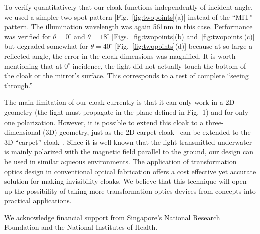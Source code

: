 \documentclass[preprint,preprintnumbers,amsmath,amssymb]{revtex4}
\begin{document}
To verify quantitatively that our cloak functions independently of
incident angle, we used a simpler two-spot pattern
[Fig.~\ref{fig:twopoints}(a)] instead of the ``MIT'' pattern. The
illumination wavelength was again 561nm in this case. Performance
was verified for $\theta=0^\circ$ and $\theta=18^\circ$
[Figs.~\ref{fig:twopoints}(b) and~\ref{fig:twopoints}(c)] but
degraded somewhat for $\theta=40^\circ$
[Fig.~\ref{fig:twopoints}(d)] because at so large a reflected angle,
the error in the cloak dimensions was magnified. It is worth
mentioning that at $0^{\circ}$ incidence, the light did not actually
touch the bottom of the cloak or the mirror's surface. This
corresponds to a test of complete ``seeing through.''

The main limitation of our cloak currently is that it can only work
in a 2D geometry  (the light must propagate in the plane defined in
Fig.~1) and for only one polarization. However, it is possible to
extend this cloak to a three-dimensional (3D) geometry, just as the
2D carpet cloak~\cite{li_carpet,valentine,gabrielli,park} can be
extended to the 3D ``carpet'' cloak~\cite{ergin,huifeng}. Since it
is well known that the light transmitted underwater is mainly
polarized with the magnetic field parallel to the ground, our design
can be used in similar aqueous environments. The application of
transformation optics design in conventional optical fabrication
offers a cost effective yet accurate solution for making
invisibility cloaks. We believe that this technique will open up the
possibility of taking more transformation optics devices from
concepts into practical applications.


We acknowledge financial support from Singapore's National Research
Foundation and the National Institutes of Health.
\end{document}
